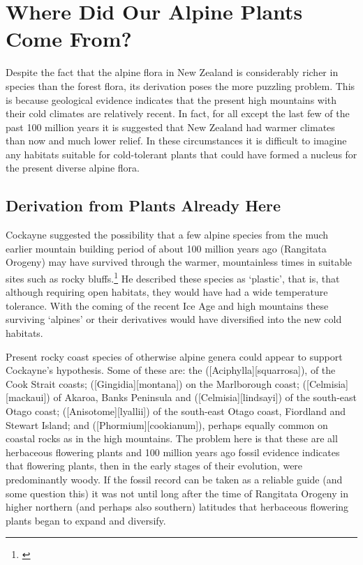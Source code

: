 \chapter{Where Did Our Alpine Plants Come From?}

Despite the fact that the alpine flora in New Zealand is considerably richer in species than the forest flora, its derivation poses the more puzzling problem.
This is because geological evidence indicates that the present high mountains with their cold climates are relatively recent.
In fact, for all except the last few of the past 100 million years it is suggested that New Zealand had warmer climates than now and much lower relief.
In these circumstances it is difficult to imagine any habitats suitable for cold-tolerant plants that could have formed a nucleus for the present diverse alpine flora.

\section{Derivation from Plants Already Here}

Cockayne suggested the possibility that a few alpine species from the much earlier mountain building period of about 100 million years ago (Rangitata Orogeny) may have survived through the warmer, mountainless times in suitable sites such as rocky bluffs.\footnote{\cite{cockayne1928vegetation}}
He described these species as `plastic', that is, that although requiring open habitats, they would have had a wide temperature tolerance.
With the coming of the recent Ice Age and high mountains these surviving `alpines' or their derivatives would have diversified into the new cold habitats.

Present rocky coast species of otherwise alpine genera could appear to support Cockayne's hypothesis.
Some of these are: the  ([Aciphylla][squarrosa]), of the Cook Strait coasts;  ([Gingidia][montana]) on the Marlborough coast;  ([Celmisia][mackaui]) of Akaroa, Banks Peninsula and  ([Celmisia][lindsayi]) of the south-east Otago coast;  ([Anisotome][lyallii]) of the south-east Otago coast, Fiordland and Stewart Island; and  ([Phormium][cookianum]), perhaps equally common on coastal rocks as in the high mountains.
The problem here is that these are all herbaceous flowering plants and 100 million years ago fossil evidence indicates that flowering plants, then in the early stages of their evolution, were predominantly woody.
If the fossil record can be taken as a reliable guide (and some question this) it was not until long after the time of Rangitata Orogeny in higher northern (and perhaps also southern) latitudes that herbaceous flowering plants began to expand and diversify.

